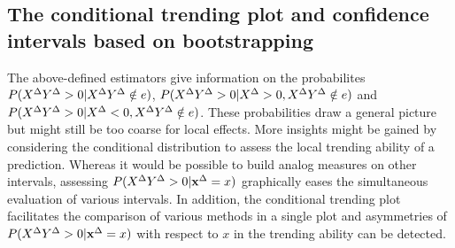 \subsection{The conditional trending plot and confidence intervals based on bootstrapping}\label{subsec:trending-cond-prob}
The above-defined estimators give information on the probabilites $P(X^{\Delta} Y^{\Delta} > 0 | X^{\Delta} Y^{\Delta} \notin e)$, $P(X^{\Delta} Y^{\Delta} > 0 | X^{\Delta} > 0, X^{\Delta} Y^{\Delta} \notin e)$ and $P(X^{\Delta} Y^{\Delta} > 0 | X^{\Delta} < 0, X^{\Delta} Y^{\Delta} \notin e)$.
These probabilities draw a general picture but might still be too coarse for local effects.
More insights might be gained by considering the conditional distribution to assess the local trending ability of a prediction.
Whereas it would be possible to build analog measures on other intervals, assessing $P(X^{\Delta} Y^{\Delta} > 0 | \mathbf{x}^{\Delta} = x)$ graphically eases the simultaneous evaluation of various intervals.
In addition, the conditional trending plot facilitates the comparison of various methods in a single plot and asymmetries of $P(X^{\Delta} Y^{\Delta} > 0 | \mathbf{x}^{\Delta} = x)$ with respect to $x$ in the trending ability can be detected.

